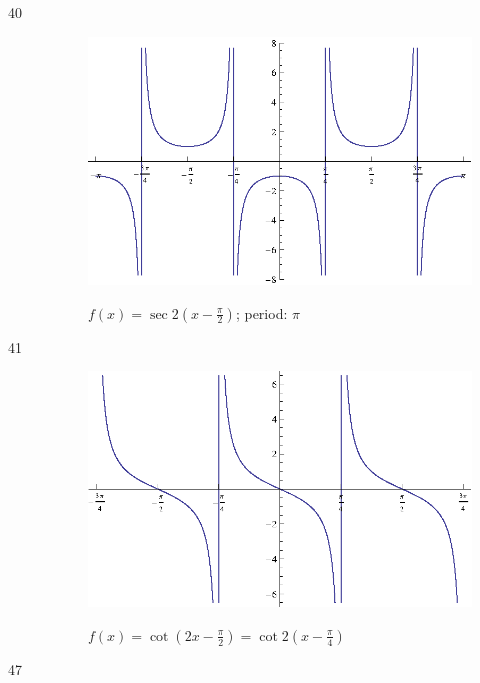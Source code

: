 \documentclass{exam}
\begin{document}
\begin{description}
      \item[40]
        \begin{figure}[H]
          \centering
          \includegraphics[scale=0.9]{exercise40.eps}

          $f(x) = \sec 2 \left( x - \frac{\pi}{2} \right) $; period: $\pi$
        \end{figure}

      \item[41]  

        \begin{figure}[H]
          \centering
          \includegraphics[scale=0.9]{exercise41.eps}

          $f(x) = \cot \left( 2x - \frac{\pi}{2} \right) = \cot 2 \left( x - \frac{\pi}{4} \right)$
        \end{figure}

      \item[47] 


\end{description}
\end{document}
